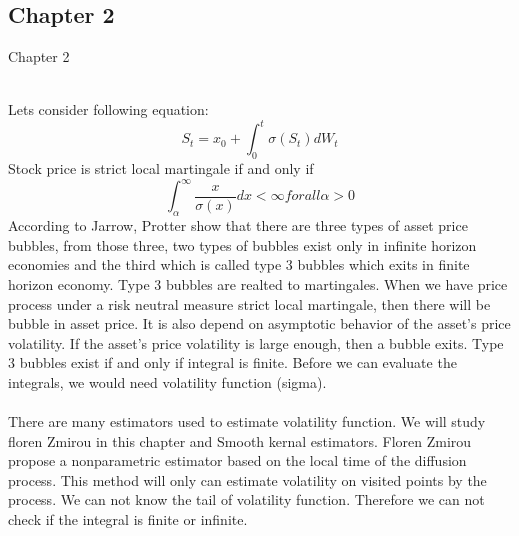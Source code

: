 
\subsection{Chapter 2}
 Chapter 2\\\
 
 Lets consider following equation:
 \begin{equation}
S_t = x_0 + \int_0^t \sigma\left(S_t\right)dW_t
\end{equation}
 Stock price is strict local martingale if and only if \\
\begin{equation}
\int_\alpha^\infty \frac{x}{\sigma\left(x\right)}dx < \infty  for all \alpha >0
\end{equation} 
According to Jarrow, Protter show that there are three types of asset price bubbles, from those three, two types of bubbles exist only in infinite horizon economies and the third which is called type 3 bubbles which exits in finite horizon economy. Type 3 bubbles are realted to martingales. When we have price process under a risk neutral measure strict local martingale, then there will be bubble in asset price. It is also depend on asymptotic behavior of the asset's price volatility. If the asset's price volatility is large enough, then a bubble exits. Type 3 bubbles exist if and only if integral is finite. Before we can evaluate the integrals, we would need volatility function (sigma). \\\\
There are many estimators used to estimate volatility function. We will study floren Zmirou in this chapter and Smooth kernal estimators. Floren Zmirou propose a nonparametric estimator based on the local time of the diffusion process. This method will only can estimate volatility on visited points by the process. We can not know the tail of volatility function. Therefore we can not check if the integral is finite or infinite. 
 